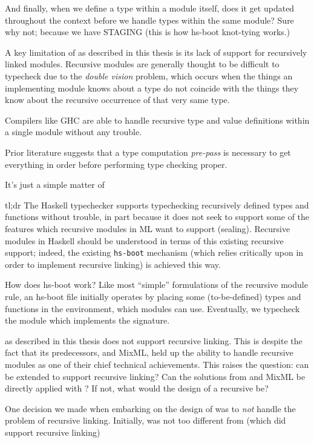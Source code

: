 And finally, when we define a type within a module itself, does it get updated
throughout the context before we handle types within the same module? Sure
why not; because we have STAGING (this is how hs-boot knot-tying works.)

A key limitation of \Backpack{} as described in this thesis is its
lack of support for recursively linked modules.  Recursive modules
are generally thought to be difficult to typecheck due to the
\emph{double vision} problem, which occurs when the things an
implementing module knows about a type do not coincide with the
things they know about the recursive occurrence of that very same
type.


Compilers like GHC are able to handle recursive type and value
definitions within a single module without any trouble.


Prior literature suggests that a type computation \emph{pre-pass}
is necessary to get everything in order before performing type
checking proper.



It's just a simple matter of 


tl;dr The Haskell typechecker supports typechecking recursively
defined types and functions without trouble, in part because it
does not seek to support some of the features which recursive
modules in ML want to support (sealing).  Recursive modules in Haskell
should be understood in terms of this existing recursive support; indeed,
the existing \verb|hs-boot| mechanism (which \OldBackpack{} relies critically
upon in order to implement recursive linking) is achieved this way.


How does hs-boot work?  Like most ``simple'' formulations of the
recursive module rule, an hs-boot file initially operates by placing
some (to-be-defined) types and functions in the environment, which
modules can use.  Eventually, we typecheck the module which implements
the signature.




\Backpack{} as described in this thesis does not support recursive
linking. This is despite the fact that its predecessors, \OldBackpack{}
and MixML, held up the ability to handle recursive modules as one of
their chief technical achievements.  This raises the question: can
\Backpack{} be extended to support recursive linking?  Can the solutions
from \OldBackpack{} and MixML be directly applied with \Backpack{}?  If
not, what would the design of a recursive \Backpack{} be?


One decision we made when embarking on the design of \Backpack{}
was to \emph{not} handle the problem of recursive linking.  Initially,
\Backpack{} was not too different from \OldBackpack{} (which did
support recursive linking)


